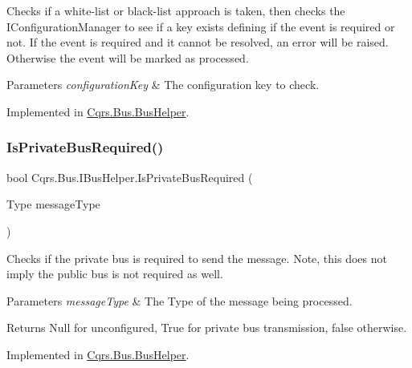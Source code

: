 Checks if a white-\/list or black-\/list approach is taken, then checks the I\+Configuration\+Manager to see if a key exists defining if the event is required or not. If the event is required and it cannot be resolved, an error will be raised. Otherwise the event will be marked as processed. 


\begin{DoxyParams}{Parameters}
{\em configuration\+Key} & The configuration key to check.\\
\hline
\end{DoxyParams}


Implemented in \hyperlink{classCqrs_1_1Bus_1_1BusHelper_a60a9603d5c6b7f29ee42491475714895_a60a9603d5c6b7f29ee42491475714895}{Cqrs.\+Bus.\+Bus\+Helper}.

\mbox{\label{interfaceCqrs_1_1Bus_1_1IBusHelper_af73d5bb5f33e9d8422309f6b3ac73369_af73d5bb5f33e9d8422309f6b3ac73369}} 
\subsubsection{\texorpdfstring{Is\+Private\+Bus\+Required()}{IsPrivateBusRequired()}}
{\footnotesize\ttfamily bool Cqrs.\+Bus.\+I\+Bus\+Helper.\+Is\+Private\+Bus\+Required (\begin{DoxyParamCaption}\item[{Type}]{message\+Type }\end{DoxyParamCaption})}



Checks if the private bus is required to send the message. Note, this does not imply the public bus is not required as well. 


\begin{DoxyParams}{Parameters}
{\em message\+Type} & The Type of the message being processed.\\
\hline
\end{DoxyParams}
\begin{DoxyReturn}{Returns}
Null for unconfigured, True for private bus transmission, false otherwise.
\end{DoxyReturn}


Implemented in \hyperlink{classCqrs_1_1Bus_1_1BusHelper_aec31c15f8f81de5079d52de2bfcbc718_aec31c15f8f81de5079d52de2bfcbc718}{Cqrs.\+Bus.\+Bus\+Helper}.

